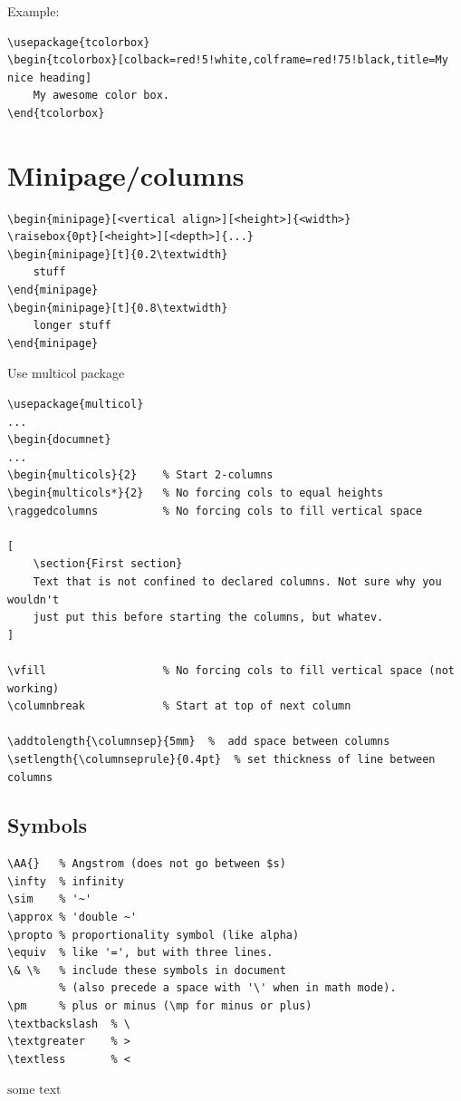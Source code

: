 \documentclass{article}
\begin{document}
Example:
\begin{lstlisting}
\usepackage{tcolorbox}
\begin{tcolorbox}[colback=red!5!white,colframe=red!75!black,title=My nice heading]
    My awesome color box.
\end{tcolorbox}
\end{lstlisting}


\section{Minipage/columns}
\begin{lstlisting}
\begin{minipage}[<vertical align>][<height>]{<width>}
\raisebox{0pt}[<height>][<depth>]{...}
\begin{minipage}[t]{0.2\textwidth}
    stuff
\end{minipage}
\begin{minipage}[t]{0.8\textwidth}
    longer stuff
\end{minipage}
\end{lstlisting}

Use multicol package
\begin{lstlisting}
\usepackage{multicol}
...
\begin{documnet}
...
\begin{multicols}{2}    % Start 2-columns
\begin{multicols*}{2}   % No forcing cols to equal heights
\raggedcolumns          % No forcing cols to fill vertical space

[
    \section{First section}
    Text that is not confined to declared columns. Not sure why you wouldn't
    just put this before starting the columns, but whatev.
]

\vfill                  % No forcing cols to fill vertical space (not working)
\columnbreak            % Start at top of next column

\addtolength{\columnsep}{5mm}  %  add space between columns
\setlength{\columnseprule}{0.4pt}  % set thickness of line between columns
\end{lstlisting}

\begin{samepage}
\section{Symbols}
\begin{lstlisting}
\AA{}   % Angstrom (does not go between $s)
\infty  % infinity
\sim    % '~'
\approx % 'double ~'
\propto % proportionality symbol (like alpha)
\equiv  % like '=', but with three lines.
\& \%   % include these symbols in document
        % (also precede a space with '\' when in math mode).
\pm     % plus or minus (\mp for minus or plus)
\textbackslash  % \
\textgreater    % >
\textless       % <
\end{lstlisting}

$\textrm{some\ text}$    %
\end{samepage}
\end{document}
